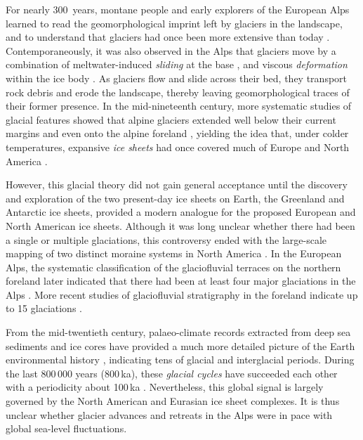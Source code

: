 \documentclass[tc, manuscript]{copernicus}
\begin{document}
    For nearly 300~years, montane people and early explorers of the European
    Alps learned to read the geomorphological imprint left by glaciers in the
    landscape, and to understand that glaciers had once been more extensive
    than today \citep[e.g.,][p.~21]{Windham.Martel.1744}. Contemporaneously,
    it was also observed in the Alps that glaciers move by a combination of
    meltwater-induced \emph{sliding} at the base \citep[\S532]{Saussure.1779},
    and viscous \emph{deformation} within the ice body \citep{Forbes.1846b}. As
    glaciers flow and slide across their bed, they transport rock debris and
    erode the landscape, thereby leaving geomorphological traces of their
    former presence. In the mid-nineteenth
    century, more systematic studies of glacial features showed that alpine
    glaciers extended well below their current margins \citep{Venetz.1821}
    and even onto the alpine foreland \citep{Charpentier.1841}, yielding the
    idea that, under colder temperatures, expansive \emph{ice sheets} had once
    covered much of Europe and North America \citep{Agassiz.1840}.

    However, this glacial theory did not gain general acceptance until the
    discovery and exploration of the two present-day ice sheets on Earth, the
    Greenland and Antarctic ice sheets, provided a modern analogue for the
    proposed European and North American ice sheets. Although it was long
    unclear whether there had been a single or multiple glaciations,
    this controversy ended with the large-scale mapping of two distinct moraine
    systems in North America \citep{Chamberlin.1894}. In the European Alps, the
    systematic classification of the glaciofluvial terraces on the northern
    foreland later indicated that there had been at least four major
    glaciations in the Alps \citep{Penck.Bruckner.1909}. More recent studies
    of glaciofluvial stratigraphy in the foreland indicate up to 15 glaciations
    \citep{Schluchter.1988, Ivy-Ochs.etal.2008, Preusser.etal.2011}.

    From the mid-twentieth
    century, palaeo-climate records extracted from deep sea sediments and
    ice cores have provided a much more detailed picture of the Earth
    environmental history \citep[e.g.,][]{Emiliani.1955,
    Shackleton.Opdyke.1973, Dansgaard.etal.1993, Augustin.etal.2004},
    indicating tens of glacial and
    interglacial periods. During the last 800\,000 years (800\,ka), these
    \emph{glacial cycles}
    have succeeded each other with a periodicity about 100\,ka \citep{Hays.etal.1976,
    Augustin.etal.2004}. Nevertheless, this global signal is largely governed
    by the North American and Eurasian ice sheet complexes. It is thus unclear
    whether glacier advances and retreats in the Alps were in pace with global
    sea-level fluctuations.
\end{document}
